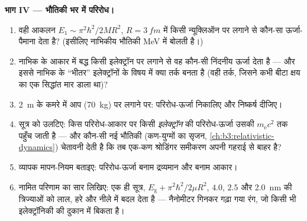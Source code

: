 \begin{problem}
\medskip\noindent\textbf{भाग IV --- भौतिकी भर में परिरोध।}
\begin{enumerate}[resume]
  \item वही आकलन $E_1 \sim \pi^2\hbar^2/2MR^2$, $R = \qty{3}{fm}$ में
        किसी न्यूक्लिऑन पर लगाने से कौन-सा ऊर्जा-पैमाना देता है?
        (इसीलिए नाभिकीय भौतिकी MeV में बोलती है।)
  \item नाभिक के आकार में बद्ध किसी इलेक्ट्रॉन पर लगाने से वह कौन-सी
        निंदनीय ऊर्जा देता है --- और इससे नाभिक के ``भीतर''
        इलेक्ट्रॉनों के विषय में क्या तर्क बनता है (वही तर्क, जिसने
        कभी बीटा क्षय का एक सिद्धांत मार डाला था)?
  \item \qty{2}{m} के कमरे में आप (\qty{70}{kg}) पर लगाने पर:
        परिरोध-ऊर्जा निकालिए और निष्कर्ष दीजिए।
  \item सूत्र को उलटिए: किस परिरोध-आकार पर किसी \emph{इलेक्ट्रॉन} की
        परिरोध-ऊर्जा उसकी 
        $m_{\text{e}}c^2$ तक पहुँच जाती है --- और कौन-सी नई भौतिकी
        (कण-युग्मों का सृजन, \cref{ch:b3:relativistic-dynamics})
        चेतावनी देती है कि तब एक-कण श्रोडिंगर समीकरण अपनी गहराई से
        बाहर है?
  \item व्यापक मापन-नियम बताइए: परिरोध-ऊर्जा बनाम द्रव्यमान और बनाम
        आकार।
  \item नामित परिणाम का सार लिखिए: एक ही सूत्र,
        $E_{\text{g}} + \pi^2\hbar^2/2\mu R^2$,
        $4.0$, $2.5$ और \qty{2.0}{nm} की त्रिज्याओं को लाल, हरे और
        नीले में बदल देता है --- नैनोमीटर गिनकर गढ़ा गया रंग, जो
        किसी भी इलेक्ट्रॉनिकी की दुकान में बिकता है।
\end{enumerate}
\end{problem}
